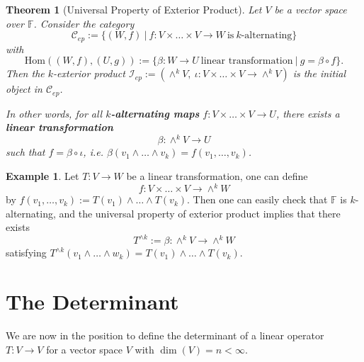 \documentclass[11pt,openany]{book}
\theoremstyle{plain}
\newtheorem{theorem}{Theorem}[chapter]
\theoremstyle{definition}
\newtheorem{example}[example]{Example}
\theoremstyle{remark}
\begin{document}
\begin{theorem}[Universal Property of Exterior Product]
    Let $V$ be a vector space over $\mathbb{F}$. Consider the category
    $$\mathcal{C}_{ep} := \{(W,f)\ |\ f: V \times \dots \times V \to W\ \text{is}\ k\text{-alternating}\}$$
with
$$\mathrm{Hom}((W,f),(U,g)) := \{\beta : W \to U\ \text{linear transformation}\ |\ g = \beta \circ f\}.$$
Then the $k$-exterior product $\mathcal{I}_{ep} := (\wedge^k V,\ \iota: V \times \dots \times V \to \wedge^k V)$ is the initial object in $\mathcal{C}_{ep}$. 

In other words, for all {\bf $k$-alternating maps} $f: V \times \dots \times V \to U$, there exists a {\bf linear transformation} 
$$\beta: \wedge^k V  \to U$$
such that $f = \beta \circ \iota$, i.e. $\beta(v_1 \wedge \dots \wedge v_k) = f(v_1, \dots, v_k)$.
\end{theorem}

\begin{example}
Let $T: V \to W$ be a linear transformation, one can define
$$f: V \times \dots \times V \to \wedge^k W$$
by $f(v_1, \dots, v_k) := T(v_1) \wedge \dots \wedge T(v_k).$
Then one can easily check that $\mathbb{F}$ is $k$-alternating, and the universal property of exterior product implies that there exists 
$$T^{\wedge k} := \beta: \wedge^k V \to \wedge^k W$$
satisfying $T^{\wedge k}(v_1 \wedge \dots \wedge w_k) = T(v_1) \wedge \dots \wedge T(v_k)$.
\end{example}

\section{The Determinant} \label{sec-det}
We are now in the position to define the determinant of a linear operator $T:V \to V$ for a vector space $V$ with $\dim(V) = n < \infty$.
\end{document}

